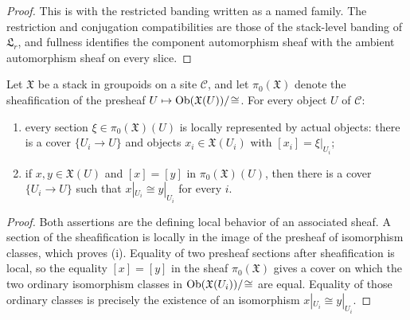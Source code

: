 \begin{proof}
This is  with the restricted banding
written as a named family. The restriction and conjugation compatibilities are
those of the stack-level banding of $\mathfrak L_r$, and fullness identifies the
component automorphism sheaf with the ambient automorphism sheaf on every slice.
\end{proof}

\begin{lemma}\label{lem:pi0-stack-local-meaning}
Let $\mathfrak X$ be a stack in groupoids on a site $\mathcal C$, and let
$\pi_0(\mathfrak X)$ denote the sheafification of the presheaf
$U\mapsto\mathrm{Ob}(\mathfrak X(U))/\!\cong$. For every object $U$ of $\mathcal C$:
\begin{enumerate}[label=(\roman*),nosep]
\item every section $\xi\in\pi_0(\mathfrak X)(U)$ is locally represented by
actual objects: there is a cover $\{U_i\to U\}$ and objects
$x_i\in\mathfrak X(U_i)$ with $[x_i]=\xi|_{U_i}$;
\item if $x,y\in\mathfrak X(U)$ and $[x]=[y]$ in $\pi_0(\mathfrak X)(U)$, then
there is a cover $\{U_i\to U\}$ such that
$x|_{U_i}\cong y|_{U_i}$ for every $i$.
\end{enumerate}
\end{lemma}

\begin{proof}
Both assertions are the defining local behavior of an associated sheaf. A
section of the sheafification is locally in the image of the presheaf of
isomorphism classes, which proves \textup{(i)}. Equality of two presheaf sections
after sheafification is local, so the equality $[x]=[y]$ in the sheaf
$\pi_0(\mathfrak X)$ gives a cover on which the two ordinary isomorphism classes
in $\mathrm{Ob}(\mathfrak X(U_i))/\!\cong$ are equal. Equality of those ordinary classes
is precisely the existence of an isomorphism
$x|_{U_i}\cong y|_{U_i}$.
\end{proof}

